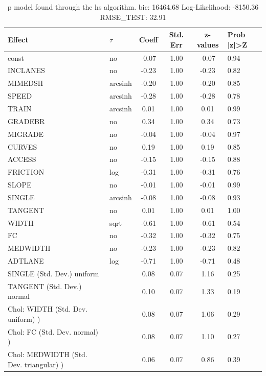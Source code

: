 \begin{table}
	\caption{p model found through the hs algorithm. bic: 16464.68 Log-Likelihood: -8150.36 RMSE_TEST: 32.91}
	\begin{center}
		\begin{tabular}{|l|l|c|c|c|l|}
			\hline
			Effect & $\tau$ & Coeff & Std. Err & z-values & Prob |z|>Z \\
			\hline
			const & no & -0.07 & 1.00 & -0.07 & 0.94 \\
			\hline
			INCLANES & no & -0.23 & 1.00 & -0.23 & 0.82 \\
			\hline
			MIMEDSH & arcsinh & -0.20 & 1.00 & -0.20 & 0.85 \\
			\hline
			SPEED & arcsinh & -0.28 & 1.00 & -0.28 & 0.78 \\
			\hline
			TRAIN & arcsinh & 0.01 & 1.00 & 0.01 & 0.99 \\
			\hline
			GRADEBR & no & 0.34 & 1.00 & 0.34 & 0.73 \\
			\hline
			MIGRADE & no & -0.04 & 1.00 & -0.04 & 0.97 \\
			\hline
			CURVES & no & 0.19 & 1.00 & 0.19 & 0.85 \\
			\hline
			ACCESS & no & -0.15 & 1.00 & -0.15 & 0.88 \\
			\hline
			FRICTION & log & -0.31 & 1.00 & -0.31 & 0.76 \\
			\hline
			SLOPE & no & -0.01 & 1.00 & -0.01 & 0.99 \\
			\hline
			SINGLE & arcsinh & -0.08 & 1.00 & -0.08 & 0.93 \\
			\hline
			TANGENT & no & 0.01 & 1.00 & 0.01 & 1.00 \\
			\hline
			WIDTH & sqrt & -0.61 & 1.00 & -0.61 & 0.54 \\
			\hline
			FC & no & -0.32 & 1.00 & -0.32 & 0.75 \\
			\hline
			MEDWIDTH & no & -0.23 & 1.00 & -0.23 & 0.82 \\
			\hline
			ADTLANE & log & -0.71 & 1.00 & -0.71 & 0.48 \\
			\hline
			SINGLE (Std. Dev.) uniform &  & 0.08 & 0.07 & 1.16 & 0.25 \\
			\hline
			TANGENT (Std. Dev.) normal &  & 0.10 & 0.07 & 1.33 & 0.19 \\
			\hline
			 Chol: WIDTH (Std. Dev. uniform) ) &  & 0.08 & 0.07 & 1.06 & 0.29 \\
			\hline
			 Chol: FC (Std. Dev. normal) ) &  & 0.08 & 0.07 & 1.10 & 0.27 \\
			\hline
			 Chol: MEDWIDTH (Std. Dev. triangular) ) &  & 0.06 & 0.07 & 0.86 & 0.39 \\

\end{tabular}
\end{center}
\end{table}
